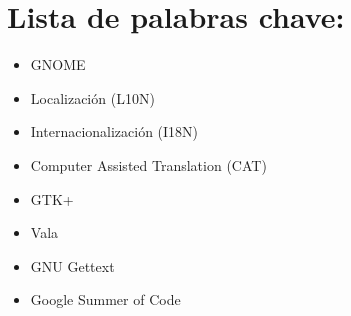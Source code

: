 %
%

\section*{Lista de palabras chave:}

\begin{itemize}
  \item GNOME
  \item Localización (L10N)
  \item Internacionalización (I18N)
  \item Computer Assisted Translation (CAT)
  \item GTK+
  \item Vala
  \item GNU Gettext
  \item Google Summer of Code
\end{itemize}
